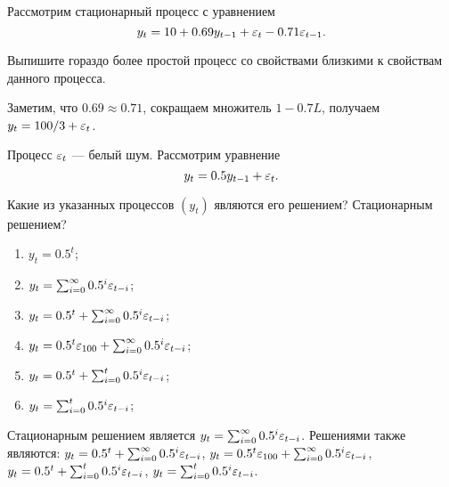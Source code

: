 \begin{problem}
Рассмотрим стационарный процесс с уравнением
\[
y_t = 10 + 0.69 y_{t-1} + \varepsilon_t - 0.71 \varepsilon_{t-1}.
\]

Выпишите гораздо более простой процесс со свойствами близкими к свойствам данного процесса.
\begin{sol}
Заметим, что $0.69\approx 0.71$, сокращаем множитель $1-0.7L$, получаем $y_t = 100/3 + \varepsilon_t$.
\end{sol}
\end{problem}


\begin{problem}
Процесс $\varepsilon_t$ — белый шум. Рассмотрим уравнение
\[
y_t = 0.5 y_{t-1} + \varepsilon_t.
\]

Какие из указанных процессов $(y_t)$ являются его решением? Стационарным решением?
\begin{enumerate}
  \item $y_t = 0.5^t$;
  \item $y_t = \sum_{i=0}^{\infty} 0.5^i \varepsilon_{t-i}$;
  \item $y_t = 0.5^t + \sum_{i=0}^{\infty} 0.5^i \varepsilon_{t-i}$;
  \item $y_t = 0.5^t\varepsilon_{100} + \sum_{i=0}^{\infty} 0.5^i \varepsilon_{t-i}$;
  \item $y_t = 0.5^t + \sum_{i=0}^{t} 0.5^i \varepsilon_{t-i}$;
  \item $y_t = \sum_{i=0}^{t} 0.5^i \varepsilon_{t-i}$;
\end{enumerate}


\begin{sol}
Стационарным решением является $y_t = \sum_{i=0}^{\infty} 0.5^i \varepsilon_{t-i}$. Решениями также являются: $y_t = 0.5^t + \sum_{i=0}^{\infty} 0.5^i \varepsilon_{t-i}$, $y_t = 0.5^t\varepsilon_{100} + \sum_{i=0}^{\infty} 0.5^i \varepsilon_{t-i}$, $y_t = 0.5^t + \sum_{i=0}^{t} 0.5^i \varepsilon_{t-i}$, $y_t = \sum_{i=0}^{t} 0.5^i \varepsilon_{t-i}$.
\end{sol}
\end{problem}



